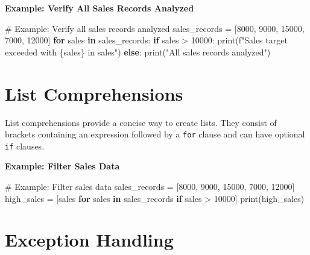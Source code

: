 \documentclass[
  letterpaper,
  DIV=11,
  numbers=noendperiod]{scrreprt}
\newenvironment{Shaded}{\begin{snugshade}}{\end{snugshade}}
\newcommand{\BuiltInTok}[1]{\textcolor[rgb]{0.00,0.23,0.31}{#1}}
\newcommand{\CommentTok}[1]{\textcolor[rgb]{0.37,0.37,0.37}{#1}}
\newcommand{\ControlFlowTok}[1]{\textcolor[rgb]{0.00,0.23,0.31}{\textbf{#1}}}
\newcommand{\DecValTok}[1]{\textcolor[rgb]{0.68,0.00,0.00}{#1}}
\newcommand{\KeywordTok}[1]{\textcolor[rgb]{0.00,0.23,0.31}{\textbf{#1}}}
\newcommand{\NormalTok}[1]{\textcolor[rgb]{0.00,0.23,0.31}{#1}}
\newcommand{\OperatorTok}[1]{\textcolor[rgb]{0.37,0.37,0.37}{#1}}
\newcommand{\SpecialCharTok}[1]{\textcolor[rgb]{0.37,0.37,0.37}{#1}}
\newcommand{\SpecialStringTok}[1]{\textcolor[rgb]{0.13,0.47,0.30}{#1}}
\newcommand{\StringTok}[1]{\textcolor[rgb]{0.13,0.47,0.30}{#1}}
\begin{document}
\textbf{Example: Verify All Sales Records Analyzed}

\begin{Shaded}
\begin{Highlighting}[]
\CommentTok{\# Example: Verify all sales records analyzed}
\NormalTok{sales\_records }\OperatorTok{=}\NormalTok{ [}\DecValTok{8000}\NormalTok{, }\DecValTok{9000}\NormalTok{, }\DecValTok{15000}\NormalTok{, }\DecValTok{7000}\NormalTok{, }\DecValTok{12000}\NormalTok{]}
\ControlFlowTok{for}\NormalTok{ sales }\KeywordTok{in}\NormalTok{ sales\_records:}
    \ControlFlowTok{if}\NormalTok{ sales }\OperatorTok{\textgreater{}} \DecValTok{10000}\NormalTok{:}
        \BuiltInTok{print}\NormalTok{(}\SpecialStringTok{f"Sales target exceeded with }\SpecialCharTok{\{}\NormalTok{sales}\SpecialCharTok{\}}\SpecialStringTok{ in sales"}\NormalTok{)}
\ControlFlowTok{else}\NormalTok{:}
    \BuiltInTok{print}\NormalTok{(}\StringTok{"All sales records analyzed"}\NormalTok{)}
\end{Highlighting}
\end{Shaded}

\section{List Comprehensions}\label{list-comprehensions}

List comprehensions provide a concise way to create lists. They consist
of brackets containing an expression followed by a \texttt{for} clause
and can have optional \texttt{if} clauses.

\textbf{Example: Filter Sales Data}

\begin{Shaded}
\begin{Highlighting}[]
\CommentTok{\# Example: Filter sales data}
\NormalTok{sales\_records }\OperatorTok{=}\NormalTok{ [}\DecValTok{8000}\NormalTok{, }\DecValTok{9000}\NormalTok{, }\DecValTok{15000}\NormalTok{, }\DecValTok{7000}\NormalTok{, }\DecValTok{12000}\NormalTok{]}
\NormalTok{high\_sales }\OperatorTok{=}\NormalTok{ [sales }\ControlFlowTok{for}\NormalTok{ sales }\KeywordTok{in}\NormalTok{ sales\_records }\ControlFlowTok{if}\NormalTok{ sales }\OperatorTok{\textgreater{}} \DecValTok{10000}\NormalTok{]}
\BuiltInTok{print}\NormalTok{(high\_sales)}
\end{Highlighting}
\end{Shaded}

\section{Exception Handling}\label{exception-handling-1}
\end{document}
